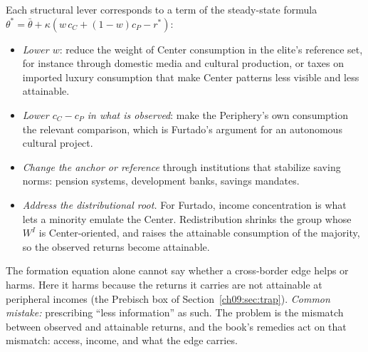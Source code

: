 \documentclass[../solutions_manual.tex]{subfiles}
\begin{document}
 Each structural lever corresponds to a term of the steady-state formula $\theta^* = \bar\theta + \kappa(w\,c_C + (1-w)c_P - r^*)$:
\begin{itemize}
\item \emph{Lower $w$}: reduce the weight of Center consumption in the elite's reference set, for instance through domestic media and cultural production, or taxes on imported luxury consumption that make Center patterns less visible and less attainable.
\item \emph{Lower $c_C - c_P$ in what is observed}: make the Periphery's own consumption the relevant comparison, which is Furtado's argument for an autonomous cultural project.
\item \emph{Change the anchor or reference} through institutions that stabilize saving norms: pension systems, development banks, savings mandates.
\item \emph{Address the distributional root.} For Furtado, income concentration is what lets a minority emulate the Center. Redistribution shrinks the group whose $W^I$ is Center-oriented, and raises the attainable consumption of the majority, so the observed returns become attainable.
\end{itemize}
The formation equation alone cannot say whether a cross-border edge helps or harms. Here it harms because the returns it carries are not attainable at peripheral incomes (the Prebisch box of Section~\ref{ch09:sec:trap}). \emph{Common mistake:} prescribing ``less information'' as such. The problem is the mismatch between observed and attainable returns, and the book's remedies act on that mismatch: access, income, and what the edge carries.
\end{document}
